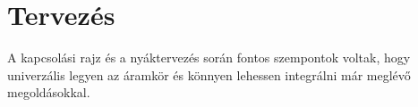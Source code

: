 \chapter{Tervezés}

A kapcsolási rajz és a nyáktervezés során fontos szempontok voltak, hogy univerzális legyen az áramkör és könnyen lehessen integrálni már meglévő megoldásokkal.


